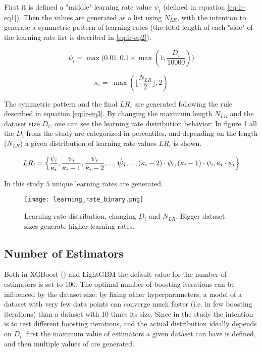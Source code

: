 First it is defined a "middle" learning rate value $\psi_i$ (defined in equation \ref{eq:lr-eq1}). Then the values are generated as a list using $N_{LR}$, with the intention to generate a symmetric pattern of learning rates (the total length of each "side" of the learning rate list is described in \ref{eq:lr-eq2}).

\begin{equation}
    \psi_i = \max\Big(0.01, 0.1 \times \max(1, \frac{D_i}{10000})\Big)
    \label{eq:lr-eq1}
\end{equation}

\begin{equation}
    \kappa_i = \cdot \max\left(\lfloor\frac{N_{LR}}{2}\rfloor, 2\right)
    \label{eq:lr-eq2}
\end{equation}

The symmetric pattern and the final $LR_i$ are generated following the rule described in equation \ref{eq:lr-eq3}. By changing the maximum length $N_{LR}$ and the dataset size $D_i$, one can see the learning rate distribution behavior: In figure \ref{fig:hyperparam-lr1} all the $D_i$ from the study are categorized in percentiles, and depending on the length ($N_{LR}$) a given distribution of learning rate values $LR_i$ is shown.

\begin{equation}
    LR_i = \Big\{\frac{\psi_i}{\kappa_i}, \frac{\psi_i}{\kappa_i - 1}, \frac{\psi_i}{\kappa_i - 2}, ..., \text{\Large $\psi_i$}, ..., (\kappa_i - 2)\cdot\psi_i, (\kappa_i - 1)\cdot\psi_i, \kappa_i\cdot\psi_i\Big\}
    \label{eq:lr-eq3}
\end{equation}

In this study $5$ unique learning rates are generated.

\begin{figure}[!h]
    \centering
    \texttt{[image: learning\_rate\_binary.png]} 
    \caption{Learning rate distribution, changing $D_i$ and $N_{LR}$. Bigger dataset sizes generate higher learning rates.}
    \label{fig:hyperparam-lr1}
\end{figure}

\subsection{Number of Estimators}

Both in XGBoost () and LightGBM the default value for the number of estimators is set to $100$. The optimal number of boosting iterations can be influenced by the dataset size: by fixing other hyperparameters, a model of a dataset with very few data points can converge much faster (i.e. in few boosting iterations) than a dataset with 10 times its size. Since in the study the intention is to test different boosting iterations, and the actual distribution ideally depends on $D_i$, first the maximum value of estimators a given dataset can have is defined, and then  multiple values of  are generated. 

